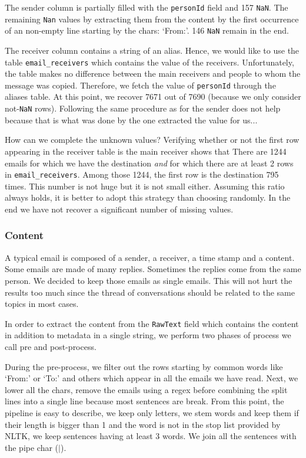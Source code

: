 \documentclass[11pt]{article}
\begin{document}
The sender column is partially filled with the \texttt{personId} field and 157 \texttt{NaN}. The remaining \texttt{Nan} values by extracting them from the content by the first occurrence of an non-empty line starting by the chars: `From:'. 146 \texttt{NaN} remain in the end.

The receiver column contains a string of an alias. Hence, we would like to use the table \texttt{email\_receivers} which contains the value of the receivers. Unfortunately, the table makes no difference between the main receivers and people to whom the message was copied. Therefore, we fetch the value of \texttt{personId} through the aliases table. At this point, we recover 7671 out of 7690 (because we only consider not-\texttt{NaN} rows). Following the same procedure as for the sender does not help because that is what was done by the one extracted the value for us...

How can we complete the unknown values? Verifying whether or not the first row appearing in the receiver table is the main receiver shows that There are 1244 emails for which we have the destination \emph{and} for which there are at least 2 rows in \texttt{email\_receivers}. Among those 1244, the first row is the destination 795 times. This number is not huge but it is not small either. Assuming this ratio always holds, it is better to adopt this strategy than choosing randomly. In the end we have not recover a significant number of missing values.

\subsubsection{Content}

A typical email is composed of a sender, a receiver, a time stamp and a content. Some emails are made of many replies. Sometimes the replies come from the same person. We decided to keep those emails as single emails. This will not hurt the results too much since the thread of conversations should be related to the same topics in most cases.

In order to extract the content from the \texttt{RawText} field which contains the content in addition to metadata in a single string, we perform two phases of process we call pre and post-process.

During the pre-process, we filter out the rows starting by common words like `From:' or `To:' and others which appear in all the emails we have read. Next, we lower all the chars, remove the emails using a regex before combining the split lines into a single line because most sentences are break. From this point, the pipeline is easy to describe, we keep only letters, we stem words and keep them if their length is bigger than 1 and the word is not in the stop list provided by NLTK, we keep sentences having at least 3 words. We join all the sentences with the pipe char ($|$).
\end{document}
